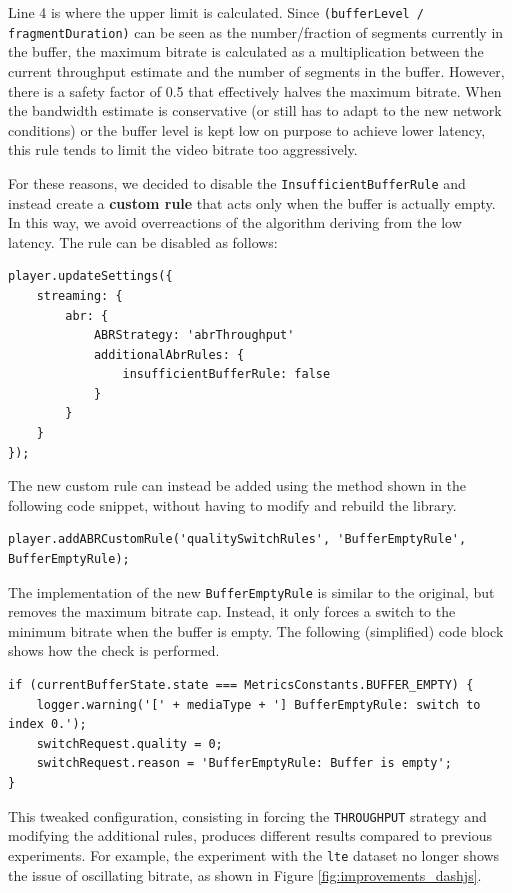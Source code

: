 Line 4 is where the upper limit is calculated. Since \texttt{(bufferLevel / fragmentDuration)} can be seen as the number/fraction of segments currently in the buffer, the maximum bitrate is calculated as a multiplication between the current throughput estimate and the number of segments in the buffer. However, there is a safety factor of 0.5 that effectively halves the maximum bitrate. When the bandwidth estimate is conservative (or still has to adapt to the new network conditions) or the buffer level is kept low on purpose to achieve lower latency, this rule tends to limit the video bitrate too aggressively.

For these reasons, we decided to disable the \texttt{InsufficientBufferRule} and instead create a \textbf{custom rule} that acts only when the buffer is actually empty. In this way, we avoid overreactions of the algorithm deriving from the low latency. The rule can be disabled as follows:

\begin{verbatim}
player.updateSettings({
    streaming: {
        abr: {
            ABRStrategy: 'abrThroughput'
            additionalAbrRules: {
                insufficientBufferRule: false
            }
        }
    }
});
\end{verbatim}

The new custom rule can instead be added using the method shown in the following code snippet, without having to modify and rebuild the library.

\begin{verbatim}
player.addABRCustomRule('qualitySwitchRules', 'BufferEmptyRule', BufferEmptyRule);
\end{verbatim}

The implementation of the new \texttt{BufferEmptyRule} is similar to the original, but removes the maximum bitrate cap. Instead, it only forces a switch to the minimum bitrate when the buffer is empty. The following (simplified) code block shows how the check is performed.

\begin{verbatim}
if (currentBufferState.state === MetricsConstants.BUFFER_EMPTY) {
    logger.warning('[' + mediaType + '] BufferEmptyRule: switch to index 0.');
    switchRequest.quality = 0;
    switchRequest.reason = 'BufferEmptyRule: Buffer is empty';
}
\end{verbatim}

This tweaked configuration, consisting in forcing the \texttt{THROUGHPUT} strategy and modifying the additional rules, produces different results compared to previous experiments. For example, the experiment with the \texttt{lte} dataset no longer shows the issue of oscillating bitrate, as shown in Figure \ref{fig:improvements_dashjs}.

